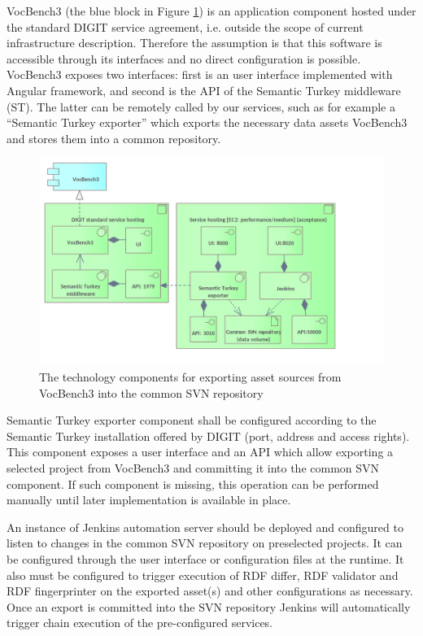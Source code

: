 	VocBench3 (the blue block in Figure \ref{fig:technology-view-implementation}) is an application component hosted under the standard DIGIT service agreement, i.e. outside the scope of current infrastructure description. Therefore the assumption is that this software is accessible through its interfaces and no direct configuration is possible. VocBench3 exposes two interfaces: first is an user interface implemented with Angular framework, and second is the API of the Semantic Turkey middleware (ST). The latter can be remotely called by our services, such as for example a ``Semantic Turkey exporter'' which exports the necessary data assets VocBench3 and stores them into a common repository. 
	
	\begin{figure}[!h]
		\centering
		\includegraphics[width=\textwidth]{images/infra-setup/implementation.png}
		\caption{The technology components for exporting asset sources from VocBench3 into the common SVN repository}
		\label{fig:technology-view-implementation}
	\end{figure}
	
	Semantic Turkey exporter component shall be configured according to the Semantic Turkey installation offered by DIGIT (port, address and access rights). This component exposes a user interface and an API which allow exporting a selected project from VocBench3 and committing it into the common SVN component. If such component is missing, this operation can be performed manually until later implementation is available in place. 
	
	An instance of Jenkins automation server should be deployed and configured to listen to changes in the common SVN repository on preselected projects. It can be configured through the user interface or configuration files at the runtime. It also must be configured to trigger execution of RDF differ, RDF validator and RDF fingerprinter on the exported asset(s) and other configurations as necessary. Once an export is committed into the SVN repository Jenkins will automatically trigger chain execution of the pre-configured services. 
	
